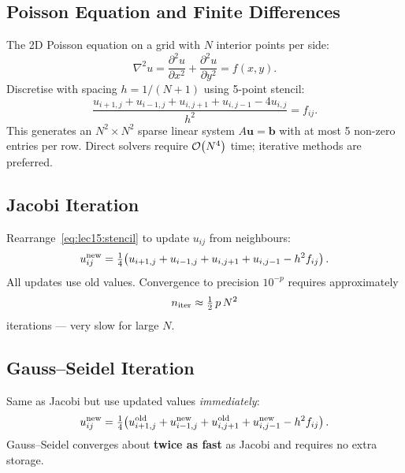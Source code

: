 \subsection{Poisson Equation and Finite Differences}\label{subsec:lec15:poisson}

The 2D Poisson equation on a grid with $N$ interior points per side:
\begin{equation}
  \nabla^2 u = \frac{\partial^2 u}{\partial x^2}
              +\frac{\partial^2 u}{\partial y^2} = f(x,y).
  \label{eq:lec15:poisson}
\end{equation}
Discretise with spacing $h = 1/(N+1)$ using 5-point stencil:
\begin{equation}
  \frac{u_{i+1,j}+u_{i-1,j}+u_{i,j+1}+u_{i,j-1}-4u_{i,j}}{h^2} = f_{ij}.
  \label{eq:lec15:stencil}
\end{equation}
This generates an $N^2\times N^2$ sparse linear system
$A\mathbf{u}=\mathbf{b}$ with at most 5 non-zero entries per row.
Direct solvers require $\mathcal{O}\!\left(N^4\right)$ time; iterative methods are preferred.

\subsection{Jacobi Iteration}\label{subsec:lec15:jacobi}

Rearrange~\eqref{eq:lec15:stencil} to update $u_{ij}$ from neighbours:
\begin{equation}
  u_{ij}^{\rm new} = \tfrac{1}{4}\!\left(
    u_{i+1,j}+u_{i-1,j}+u_{i,j+1}+u_{i,j-1}-h^2 f_{ij}
  \right).
  \label{eq:lec15:jacobi}
\end{equation}
All updates use old values.  Convergence to precision $10^{-p}$ requires
approximately
\begin{equation}
  n_{\rm iter} \approx \tfrac{1}{2}\,p\,N^2
  \label{eq:lec15:jacobi_iters}
\end{equation}
iterations — very slow for large $N$.

\subsection{Gauss--Seidel Iteration}\label{subsec:lec15:gs}

Same as Jacobi but use updated values \emph{immediately}:
\begin{equation}
  u_{ij}^{\rm new} = \tfrac{1}{4}\!\left(
    u_{i+1,j}^{\rm old}+u_{i-1,j}^{\rm new}+u_{i,j+1}^{\rm old}
    +u_{i,j-1}^{\rm new}-h^2 f_{ij}
  \right).
  \label{eq:lec15:gs}
\end{equation}
Gauss–Seidel converges about \textbf{twice as fast} as Jacobi and
requires no extra storage.

